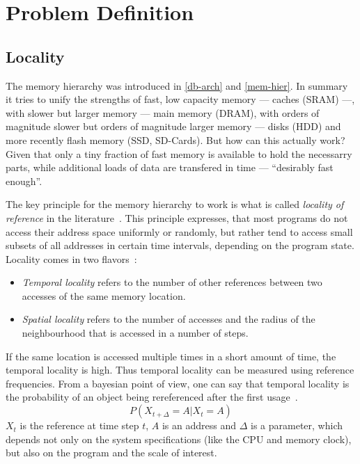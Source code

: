 \chapter{Problem Definition}\label{\positionnumber}
\section{Locality}\label{\positionnumber}
    The memory hierarchy was introduced in \ref{db-arch} and \ref{mem-hier}. 
    In summary it tries to unify the strengths of fast, low capacity memory --- caches (SRAM) ---, with slower but larger memory --- main memory (DRAM), with orders of magnitude slower but orders of magnitude larger memory --- disks (HDD) and more recently flash memory (SSD, SD-Cards).
    But how can this actually work? 
    Given that only a tiny fraction of fast memory is available to hold the necessarry parts, while additional loads of data are transfered in time --- ``desirably fast enough''.
    
    The key principle for the memory hierarchy to work is what is called \textit{locality of reference} in the literature~\autocite{jacob2010memory, tanenbaum2015modern}. 
    This principle expresses, that most programs do not access their address space uniformly or randomly, but rather tend to access small subsets of all addresses in certain time intervals, depending on the program state.
    Locality comes in two flavors~\autocite{denning2006locality}: 
    
    \begin{itemize}
     \item \textit{Temporal locality} refers to the number of other references between two accesses of the same memory location. 
     \item \textit{Spatial locality} refers to the number of accesses and the radius of the neighbourhood that is accessed in a number of steps.
    \end{itemize}
    
    If the same location is accessed multiple times in a short amount of time, the temporal locality is high.
    Thus temporal locality can be measured using reference frequencies.
    From a bayesian point of view, one can say that temporal locality is the probability of an object being rereferenced after the first usage~\autocite{gupta2013locality}. 
    \[ P (X_{t + \Delta} = A | X_t = A) \]
    $X_t$ is the reference at time step $t$, $A$ is an address and $\Delta$ is a parameter, which depends not only on the system specifications (like the CPU and memory clock), but also on the program and the scale of interest.
    
